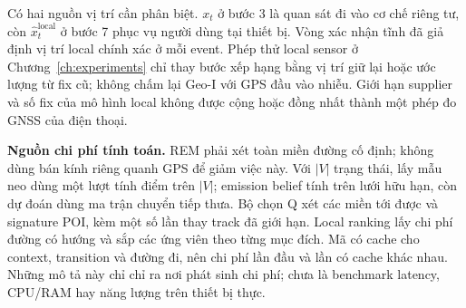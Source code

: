 Có hai nguồn vị trí cần phân biệt. $x_t$ ở bước 3 là quan sát đi vào cơ chế
riêng tư, còn $\hat x_t^{\mathrm{local}}$ ở bước 7 phục vụ người dùng tại
thiết bị. Vòng xác nhận tĩnh đã giả định vị trí local chính xác ở mỗi event.
Phép thử local sensor ở Chương~\ref{ch:experiments} chỉ thay bước xếp hạng
bằng vị trí giữ lại hoặc ước lượng từ fix cũ; không chấm lại Geo-I với GPS
đầu vào nhiễu. Giới hạn supplier và số fix của mô hình local không được cộng
hoặc đồng nhất thành một phép đo GNSS của điện thoại.

\textbf{Nguồn chi phí tính toán.} REM phải xét toàn miền đường cố định;
không dùng bán kính riêng quanh GPS để giảm việc này. Với $|V|$ trạng thái,
lấy mẫu neo dùng một lượt tính điểm trên $|V|$; emission belief tính trên
lưới hữu hạn, còn dự đoán dùng ma trận chuyển tiếp thưa. Bộ chọn Q xét các
miền tới được và signature POI, kèm một số lần thay track đã giới hạn.
Local ranking lấy chi phí đường có hướng và sắp các ứng viên theo từng mục
đích. Mã có cache cho context, transition và đường đi, nên chi phí lần đầu
và lần có cache khác nhau. Những mô tả này chỉ chỉ ra nơi phát sinh chi phí;
chưa là benchmark latency, CPU/RAM hay năng lượng trên thiết bị thực.
